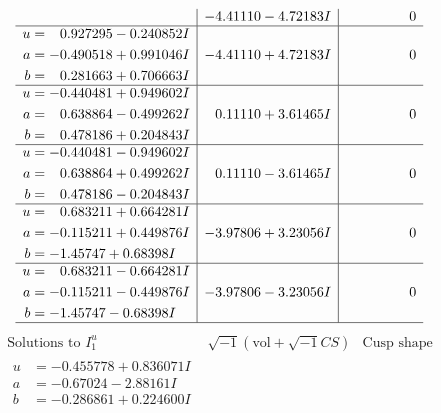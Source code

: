 \documentclass[1p]{elsarticle_modified}
\theoremstyle{definition}
\newcommand{\I}{\sqrt{-1}}
\begin{document}
$$\begin{array}{c|c|c}
 & -4.41110 - 4.72183 I & \phantom{-0.000000 } 0 \\ \hline\begin{aligned}
u &= \phantom{-}0.927295 - 0.240852 I \\
a &= -0.490518 + 0.991046 I \\
b &= \phantom{-}0.281663 + 0.706663 I\end{aligned}
 & -4.41110 + 4.72183 I & \phantom{-0.000000 } 0 \\ \hline\begin{aligned}
u &= -0.440481 + 0.949602 I \\
a &= \phantom{-}0.638864 - 0.499262 I \\
b &= \phantom{-}0.478186 + 0.204843 I\end{aligned}
 & \phantom{-}0.11110 + 3.61465 I & \phantom{-0.000000 } 0 \\ \hline\begin{aligned}
u &= -0.440481 - 0.949602 I \\
a &= \phantom{-}0.638864 + 0.499262 I \\
b &= \phantom{-}0.478186 - 0.204843 I\end{aligned}
 & \phantom{-}0.11110 - 3.61465 I & \phantom{-0.000000 } 0 \\ \hline\begin{aligned}
u &= \phantom{-}0.683211 + 0.664281 I \\
a &= -0.115211 + 0.449876 I \\
b &= -1.45747 + 0.68398 I\end{aligned}
 & -3.97806 + 3.23056 I & \phantom{-0.000000 } 0 \\ \hline\begin{aligned}
u &= \phantom{-}0.683211 - 0.664281 I \\
a &= -0.115211 - 0.449876 I \\
b &= -1.45747 - 0.68398 I\end{aligned}
 & -3.97806 - 3.23056 I & \phantom{-0.000000 } 0\\
 \hline 
 \end{array}$$\newpage$$\begin{array}{c|c|c}  
\text{Solutions to }I^u_{1}& \I (\text{vol} + \sqrt{-1}CS) & \text{Cusp shape}\\
 \hline 
\begin{aligned}
u &= -0.455778 + 0.836071 I \\
a &= -0.67024 - 2.88161 I \\
b &= -0.286861 + 0.224600 I\end{aligned}

\end{array}$$
\end{document}
